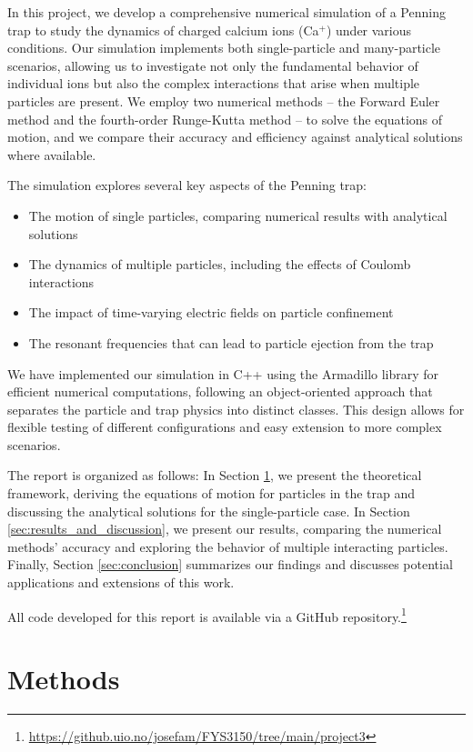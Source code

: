 \documentclass[english,notitlepage,reprint,nofootinbib]{revtex4-2}  %
\begin{document}
In this project, we develop a comprehensive numerical simulation of a Penning trap to study the dynamics of charged calcium ions (Ca$^+$) under various conditions. Our simulation implements both single-particle and many-particle scenarios, allowing us to investigate not only the fundamental behavior of individual ions but also the complex interactions that arise when multiple particles are present. We employ two numerical methods -- the Forward Euler method and the fourth-order Runge-Kutta method -- to solve the equations of motion, and we compare their accuracy and efficiency against analytical solutions where available.

The simulation explores several key aspects of the Penning trap:
\begin{itemize}
\item The motion of single particles, comparing numerical results with analytical solutions
\item The dynamics of multiple particles, including the effects of Coulomb interactions
\item The impact of time-varying electric fields on particle confinement
\item The resonant frequencies that can lead to particle ejection from the trap
\end{itemize}

We have implemented our simulation in C++ using the Armadillo library for efficient numerical computations, following an object-oriented approach that separates the particle and trap physics into distinct classes. This design allows for flexible testing of different configurations and easy extension to more complex scenarios.

The report is organized as follows: In Section \ref{sec:methods}, we present the theoretical framework, deriving the equations of motion for particles in the trap and discussing the analytical solutions for the single-particle case. In Section \ref{sec:results_and_discussion}, we present our results, comparing the numerical methods' accuracy and exploring the behavior of multiple interacting particles. Finally, Section \ref{sec:conclusion} summarizes our findings and discusses potential applications and extensions of this work.

All code developed for this report is available via a GitHub repository.\footnote{\url{https://github.uio.no/josefam/FYS3150/tree/main/project3}}
\section{Methods}\label{sec:methods}
\end{document}
